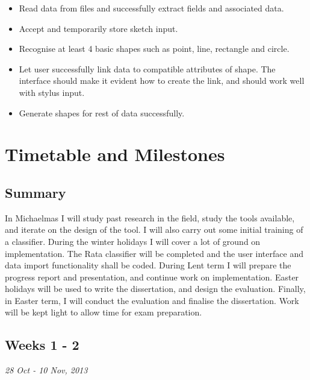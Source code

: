 \begin{itemize}

\item Read data from files and successfully extract fields and associated data.

\item Accept and temporarily store sketch input.

\item Recognise at least 4 basic shapes such as point, line, rectangle and circle. 

\item Let user successfully link data to compatible attributes of shape. The interface should make it evident how to create the link, and should work well with stylus input.

\item Generate shapes for rest of data successfully.

\end{itemize}










\section*{Timetable and Milestones}

\subsection*{Summary}

In Michaelmas I will study past research in the field, study the tools available, and iterate on the design of the tool. I will also carry out some initial training of a classifier. During the winter holidays I will cover a lot of ground on implementation. The Rata classifier will be completed and the user interface and data import functionality shall be coded. During Lent term I will prepare the progress report and presentation, and continue work on implementation. Easter holidays will be used to write the dissertation, and design the evaluation. Finally, in Easter term, I will conduct the evaluation and finalise the dissertation. Work will be kept light to allow time for exam preparation.


\subsection*{Weeks 1 - 2}
\emph{28 Oct - 10 Nov, 2013}


